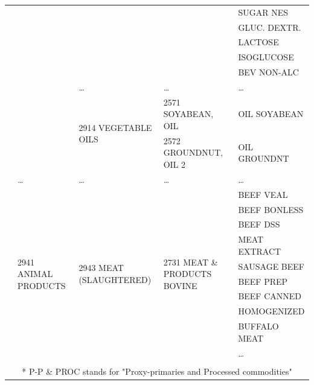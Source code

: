 \documentclass[]{article}
\begin{document}
\begin{table}[ht]
{\begin{tabular}{l|l|l|l|l}
&  &  &  & SUGAR NES \\ 
&  &  &  & GLUC. DEXTR. \\ 
&  &  &  & LACTOSE \\ 
&  &  &  & ISOGLUCOSE \\ 
&  &  &   & BEV NON-ALC \\ 
&  & … & … & … \\
\cline{3-5}
&  & \multirow{2}{*}{2914 VEGETABLE OILS} & 2571 SOYABEAN, OIL & OIL SOYABEAN \\ 
&  &  & 2572 GROUNDNUT, OIL 2 & OIL GROUNDNT \\ 
& … & … & … & … \\
\cline{2-5}
& \multirow{10}{*}{2941  ANIMAL PRODUCTS}  & \multirow{10}{*}{2943 MEAT (SLAUGHTERED)}  & \multirow{10}{*}{2731 MEAT \& PRODUCTS BOVINE}  & BEEF VEAL \\ 
&  &   &  & BEEF BONLESS \\ 
&  &  &  & BEEF DSS \\ 
&  &  &  & MEAT EXTRACT \\ 
&  &  &  & SAUSAGE BEEF \\ 
&  &  &  & BEEF PREP \\ 
&  &  &  & BEEF CANNED \\ 
&  &  &  & HOMOGENIZED \\ 
&  &  &  & BUFFALO MEAT \\ 
& … & … & … & … \\
\bottomrule
\\
\multicolumn{5}{c|}{* P-P \& PROC stands for "Proxy-primaries and Processed commodities"}
\end{tabular}
}
\end{table}
\end{document}
